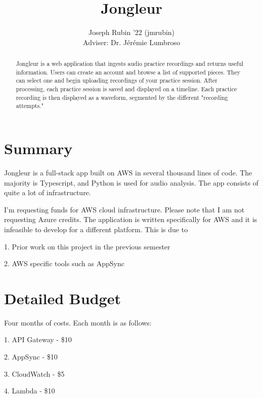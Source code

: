 \documentclass{article}
\begin{document}
\title{Jongleur}

\author{Joseph Rubin '22 (jmrubin)
\\Adviser: Dr. Jérémie Lumbroso}

\date{}
\maketitle

\thispagestyle{empty}


\begin{abstract}
    Jongleur is a web application that ingests audio practice recordings and returns useful information.
    Users can create an account and browse a list of supported pieces.
    They can select one and begin uploading recordings of your practice session.
    After processing, each practice session is saved and displayed on a timeline.
    Each practice recording is then displayed as a waveform, segmented by the different "recording attempts."
\end{abstract}

\section{Summary}

Jongleur is a full-stack app built on AWS in several thousand lines of code.
The majority is Typescript, and Python is used for audio analysis.
The app consists of quite a lot of infrastructure.

I'm requesting funds for AWS cloud infrastructure.
Please note that I am not requesting Azure credits.
The application is written specifically for AWS and it is infeasible to develop for a different platform.
This is due to

1. Prior work on this project in the previous semester

2. AWS specific tools such as AppSync

\section{Detailed Budget}

Four months of costs.
Each month is as follows:

1. API Gateway - \$10

2. AppSync - \$10

3. CloudWatch - \$5

4. Lambda - \$10
\end{document}

